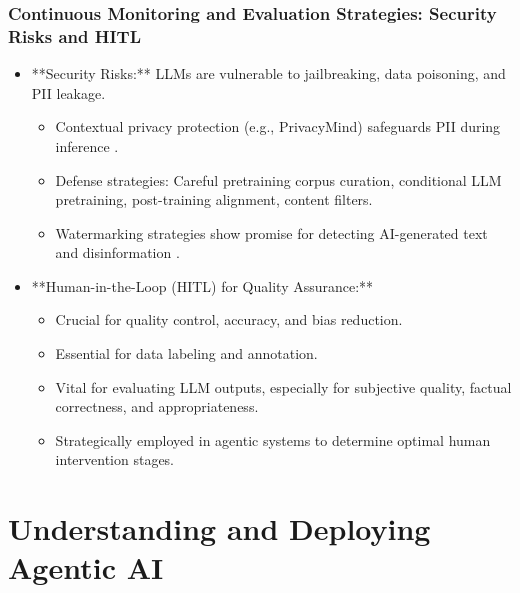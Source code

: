 \documentclass{beamer}       %
\begin{document}
\begin{frame}
    \frametitle{Continuous Monitoring and Evaluation Strategies: Security Risks and HITL}
    \tiny
    \begin{itemize}
        \item **Security Risks:** LLMs are vulnerable to jailbreaking, data poisoning, and PII leakage.
        \begin{itemize}
            \tiny
            \item Contextual privacy protection (e.g., PrivacyMind) safeguards PII during inference .
            \item Defense strategies: Careful pretraining corpus curation, conditional LLM pretraining, post-training alignment, content filters.
            \item Watermarking strategies show promise for detecting AI-generated text and disinformation .
        \end{itemize}
        \item **Human-in-the-Loop (HITL) for Quality Assurance:**
        \begin{itemize}
            \tiny
            \item Crucial for quality control, accuracy, and bias reduction.
            \item Essential for data labeling and annotation.
            \item Vital for evaluating LLM outputs, especially for subjective quality, factual correctness, and appropriateness.
            \item Strategically employed in agentic systems to determine optimal human intervention stages.
        \end{itemize}
    \end{itemize}
\end{frame}

\section{Understanding and Deploying Agentic AI}
\end{document}
